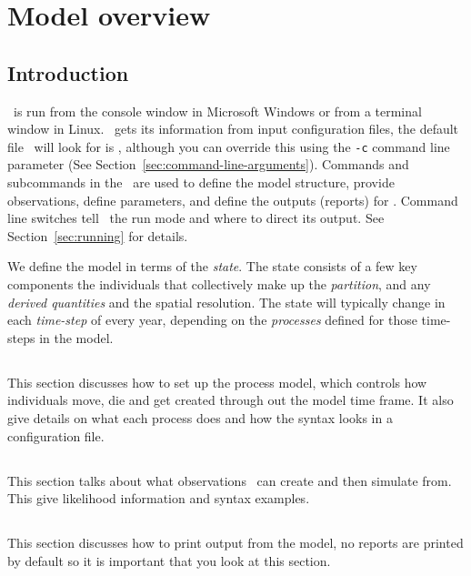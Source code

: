 \section{Model overview\label{sec:overview}}

\subsection{Introduction}

\IBM\ is run from the console window in Microsoft Windows or from a terminal window in Linux. \IBM\ gets its information from input configuration files, the default file \IBM\ will look for is \emph{\config}, although you can override this using the \texttt{-c} command line parameter (See Section~\ref{sec:command-line-arguments}). Commands and subcommands in the \config\ are used to define the model structure, provide observations, define parameters, and define the outputs (reports) for \IBM. Command line switches tell \IBM\ the run mode and where to direct its output. See Section~\ref{sec:running} for details.

We define the model in terms of the \emph{state}. The state consists of a few key components the individuals that collectively make up the \emph{partition}, and any \emph{derived quantities} and the spatial resolution. The state will typically change in each \emph{time-step} of every year, depending on the \emph{processes} defined for those time-steps in the model. 

\subsection{}
This section discusses how to set up the process model, which controls how individuals move, die and get created through out the model time frame. It also give details on what each process does and how the syntax looks in a configuration file.

\subsection{}
This section talks about what observations \IBM\ can create and then simulate from. This give likelihood information and syntax examples.

\subsection{}
This section discusses how to print output from the model, no reports are printed by default so it is important that you look at this section.